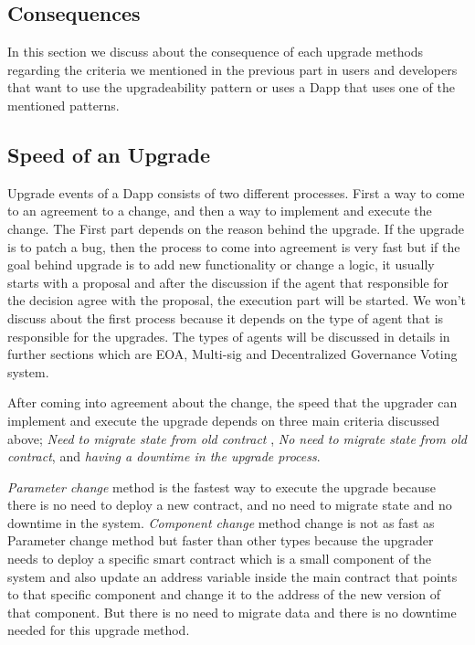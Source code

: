 
\subsection{Consequences}
In this section we discuss about the consequence of each upgrade methods regarding the criteria we mentioned in the previous part in users and developers that want to use the upgradeability pattern or uses a Dapp that uses one of the mentioned patterns.

\subsection{Speed of an Upgrade}
Upgrade events of a Dapp consists of two different processes. First a way to come to an agreement to a change, and then a way to implement and execute the change. The First part depends on the reason behind the upgrade. If the upgrade is to patch a bug, then the process to come into agreement is very fast but if the goal behind upgrade is to add new functionality or change a logic, it usually starts with a proposal and after the discussion if the agent that responsible for the decision agree with the proposal, the execution part will be started. We won't discuss about the first process because it depends on the type of agent that is responsible for the upgrades. The types of agents will be discussed in details in further sections which are EOA, Multi-sig and Decentralized Governance Voting system. 

After coming into agreement about the change, the speed that the upgrader can implement and execute the upgrade depends on three main criteria discussed above; \textit{Need to migrate state from old contract} , \textit{No need to migrate state from old contract}, and \textit{having a downtime in the upgrade process}.
 
\textit{Parameter change} method is the fastest way to execute the upgrade because there is no need to deploy a new contract, and no need to migrate state and no downtime in the system.
\textit{Component change} method change is not as fast as Parameter change method but faster than other types because the upgrader needs to deploy a specific smart contract which is a small component of the system and also update an address variable inside the main contract that points to that specific component and change it to the address of the new version of that component. But there is no need to migrate data and there is no downtime needed for this upgrade method.

